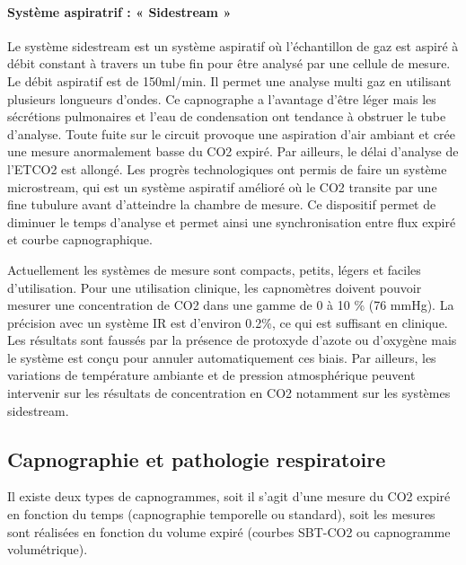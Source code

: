 \documentclass[12pt,]{article}
\let\oldparagraph\paragraph
\renewcommand{\paragraph}[1]{\oldparagraph{#1}\mbox{}}
\begin{document}
\hypertarget{systuxe8me-aspiratrif-sidestream}{%
\paragraph{Système aspiratrif : « Sidestream
»}\label{systuxe8me-aspiratrif-sidestream}}

Le système sidestream est un système aspiratif où l'échantillon de gaz
est aspiré à débit constant à travers un tube fin pour être analysé par
une cellule de mesure. Le débit aspiratif est de 150ml/min. Il permet
une analyse multi gaz en utilisant plusieurs longueurs d'ondes. Ce
capnographe a l'avantage d'être léger mais les sécrétions pulmonaires et
l'eau de condensation ont tendance à obstruer le tube d'analyse. Toute
fuite sur le circuit provoque une aspiration d'air ambiant et crée une
mesure anormalement basse du CO2 expiré. Par ailleurs, le délai
d'analyse de l'ETCO2 est allongé. Les progrès technologiques ont permis
de faire un système microstream, qui est un système aspiratif amélioré
où le CO2 transite par une fine tubulure avant d'atteindre la chambre de
mesure. Ce dispositif permet de diminuer le temps d'analyse et permet
ainsi une synchronisation entre flux expiré et courbe capnographique.

Actuellement les systèmes de mesure sont compacts, petits, légers et
faciles d'utilisation. Pour une utilisation clinique, les capnomètres
doivent pouvoir mesurer une concentration de CO2 dans une gamme de 0 à
10 \% (76 mmHg). La précision avec un système IR est d'environ 0.2\%, ce
qui est suffisant en clinique. Les résultats sont faussés par la
présence de protoxyde d'azote ou d'oxygène mais le système est conçu
pour annuler automatiquement ces biais. Par ailleurs, les variations de
température ambiante et de pression atmosphérique peuvent intervenir sur
les résultats de concentration en CO2 notamment sur les systèmes
sidestream.

\hypertarget{capnographie-et-pathologie-respiratoire}{%
\subsection{Capnographie et pathologie
respiratoire}\label{capnographie-et-pathologie-respiratoire}}

Il existe deux types de capnogrammes, soit il s'agit d'une mesure du CO2
expiré en fonction du temps (capnographie temporelle ou standard), soit
les mesures sont réalisées en fonction du volume expiré (courbes SBT-CO2
ou capnogramme volumétrique).
\end{document}
